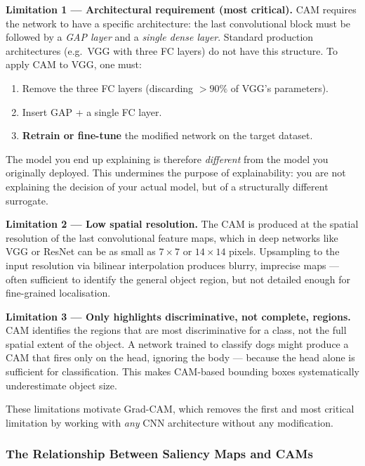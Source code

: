 \documentclass[11pt,a4paper]{article}
\begin{document}
\begin{warnbox}
\textbf{Limitation 1 — Architectural requirement (most critical).} CAM requires the network to have a specific architecture: the last convolutional block must be followed by a \emph{GAP layer} and a \emph{single dense layer}. Standard production architectures (e.g.\ VGG with three FC layers) do not have this structure. To apply CAM to VGG, one must:
\begin{enumerate}
  \item Remove the three FC layers (discarding $>90\%$ of VGG's parameters).
  \item Insert GAP + a single FC layer.
  \item \textbf{Retrain or fine-tune} the modified network on the target dataset.
\end{enumerate}
The model you end up explaining is therefore \emph{different} from the model you originally deployed. This undermines the purpose of explainability: you are not explaining the decision of your actual model, but of a structurally different surrogate.

\medskip
\textbf{Limitation 2 — Low spatial resolution.} The CAM is produced at the spatial resolution of the last convolutional feature maps, which in deep networks like VGG or ResNet can be as small as $7\times7$ or $14\times14$ pixels. Upsampling to the input resolution via bilinear interpolation produces blurry, imprecise maps — often sufficient to identify the general object region, but not detailed enough for fine-grained localisation.

\medskip
\textbf{Limitation 3 — Only highlights discriminative, not complete, regions.} CAM identifies the regions that are most discriminative for a class, not the full spatial extent of the object. A network trained to classify dogs might produce a CAM that fires only on the head, ignoring the body — because the head alone is sufficient for classification. This makes CAM-based bounding boxes systematically underestimate object size.
\end{warnbox}

These limitations motivate Grad-CAM, which removes the first and most critical limitation by working with \emph{any} CNN architecture without any modification.

\subsubsection{The Relationship Between Saliency Maps and CAMs}
\end{document}
